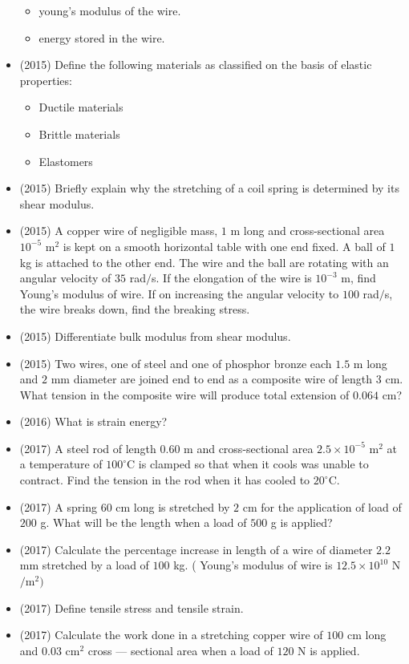 \documentclass{article}
\begin{document}
\begin{itemize}
\begin{itemize}
\item young’s modulus of the wire. 
\item energy stored in the wire. 
\end{itemize}
\item (2015)  Define the following materials as classified on the basis of elastic properties:
 \begin{itemize}
\item  Ductile materials 
\item Brittle materials
\item Elastomers
\end{itemize}
\item (2015)  Briefly explain why the stretching of a coil spring is determined by its shear modulus.
\item (2015)  A copper wire of negligible mass, $ 1$ m long and cross-sectional area $ 10^{-5}$ m$ ^{2}$ is kept on a smooth horizontal table with one end fixed.  A ball of $ 1$ kg is attached to the other end.  The wire and the ball are rotating with an angular velocity of $ 35$ rad$/$s.  If the elongation of the wire is $ 10^{-3}$ m, find Young’s modulus of wire.  If on increasing the angular velocity to $ 100$ rad$/$s, the wire breaks down, find the breaking stress.
\item (2015)  Differentiate bulk modulus from shear modulus.
\item (2015)  Two wires, one of steel and one of phosphor bronze each $ 1.5$ m long and $ 2$ mm diameter are joined end to end as a composite wire of length $ 3$ cm.  What tension in the composite wire will produce total extension of $ 0.064$ cm?
\item (2016)  What is strain energy?
\item (2017)  A steel rod of length $ 0.60$ m and cross-sectional area $ 2.5 \times 10^{-5}$ m$ ^{2}$ at a temperature of $ 100^{\circ}$C is clamped so that when it cools was unable to contract. Find the tension in the rod when it has cooled to $ 20^{\circ}$C. 
\item (2017)  A spring $ 60$ cm long is stretched by $ 2$ cm for the application of load of $ 200$ g. What will be the length when a load of $ 500$ g is applied? 
\item (2017)  Calculate the percentage increase in length of a wire of diameter $ 2.2$ mm stretched by a load of $ 100$ kg. ( Young's modulus of wire is $ 12.5 \times 10^{10}$ N$/$m$ ^{2})$
\item (2017)  Define tensile stress and tensile strain. 
\item (2017)  Calculate the work done in a stretching copper wire of $ 100$ cm long and $ 0.03 $ cm$ ^{2}$ cross — sectional area when a load of $ 120$ N is applied. 

\end{itemize}
\end{document}
